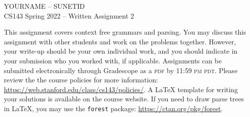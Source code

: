 \documentclass[11pt]{article}
\begin{document}
\begin{center}
\LARGE YOURNAME -- SUNETID \\
\LARGE CS143 Spring 2022 -- Written Assignment 2 \\
\end{center}

This assignment covers context free grammars and parsing. You may discuss this assignment with other students and work on the problems together. However, your write-up should be your own individual work, and you should indicate in your submission who you worked with, if applicable. Assignments can be submitted electronically through Gradescope as a \textsc{pdf} by 11:59 \textsc{pm pdt}. Please review the the course policies for more information: \url{https://web.stanford.edu/class/cs143/policies/}. A \LaTeX{} template for writing your solutions is available on the course website.
If you need to draw parse trees in \LaTeX{}, you may use the {\tt forest} package: \url{https://ctan.org/pkg/forest}.

\bigskip
\end{document}
